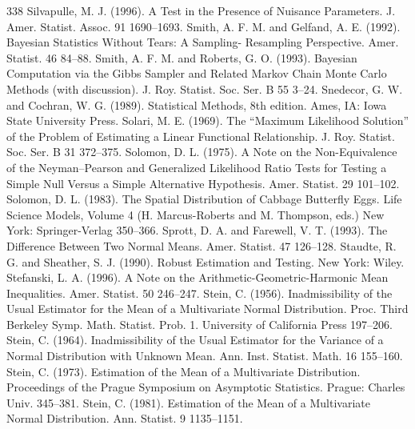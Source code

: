 \begin{thebibliography}{338}
\label{bib:source291} Silvapulle, M. J. (1996). A Test in the Presence of Nuisance Parameters. J. Amer. Statist. Assoc. 91 1690–1693.
\label{bib:source292} Smith, A. F. M. and Gelfand, A. E. (1992). Bayesian Statistics Without Tears: A Sampling- Resampling Perspective. Amer. Statist. 46 84–88.
\label{bib:source293} Smith, A. F. M. and Roberts, G. O. (1993). Bayesian Computation via the Gibbs Sampler and Related Markov Chain Monte Carlo Methods (with discussion). J. Roy. Statist. Soc. Ser. B 55 3–24.
\label{bib:source294} Snedecor, G. W. and Cochran, W. G. (1989). Statistical Methods, 8th edition. Ames, IA: Iowa State University Press.
\label{bib:source295} Solari, M. E. (1969). The “Maximum Likelihood Solution” of the Problem of Estimating a Linear Functional Relationship. J. Roy. Statist. Soc. Ser. B 31 372–375.
\label{bib:source296} Solomon, D. L. (1975). A Note on the Non-Equivalence of the Neyman–Pearson and Generalized Likelihood Ratio Tests for Testing a Simple Null Versus a Simple Alternative Hypothesis. Amer. Statist. 29 101–102.
\label{bib:source297} Solomon, D. L. (1983). The Spatial Distribution of Cabbage Butterfly Eggs. Life Science Models, Volume 4 (H. Marcus-Roberts and M. Thompson, eds.) New York: Springer-Verlag 350–366.
\label{bib:source298} Sprott, D. A. and Farewell, V. T. (1993). The Difference Between Two Normal Means. Amer. Statist. 47 126–128.
\label{bib:source299} Staudte, R. G. and Sheather, S. J. (1990). Robust Estimation and Testing. New York: Wiley.
\label{bib:source300} Stefanski, L. A. (1996). A Note on the Arithmetic-Geometric-Harmonic Mean Inequalities. Amer. Statist. 50 246–247.
\label{bib:source301} Stein, C. (1956). Inadmissibility of the Usual Estimator for the Mean of a Multivariate Normal Distribution. Proc. Third Berkeley Symp. Math. Statist. Prob. 1. University of California Press 197–206.
\label{bib:source302} Stein, C. (1964). Inadmissibility of the Usual Estimator for the Variance of a Normal Distribution with Unknown Mean. Ann. Inst. Statist. Math. 16 155–160.
\label{bib:source303} Stein, C. (1973). Estimation of the Mean of a Multivariate Distribution. Proceedings of the Prague Symposium on Asymptotic Statistics. Prague: Charles Univ. 345–381.
\label{bib:source304} Stein, C. (1981). Estimation of the Mean of a Multivariate Normal Distribution. Ann. Statist. 9 1135–1151.

\end{thebibliography}

